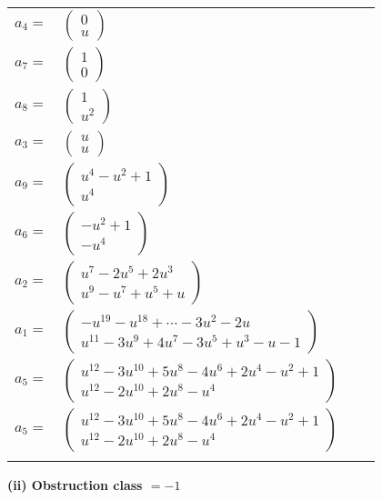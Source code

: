 \documentclass[1p]{elsarticle_modified}
\theoremstyle{definition}
\begin{document}
\begin{tabular}{m{7pt} m{180pt} m{7pt} m{180pt} }
\flushright $a_{4}=$&$\begin{pmatrix}0\\u\end{pmatrix}$ \\
\flushright $a_{7}=$&$\begin{pmatrix}1\\0\end{pmatrix}$ \\
\flushright $a_{8}=$&$\begin{pmatrix}1\\u^2\end{pmatrix}$ \\
\flushright $a_{3}=$&$\begin{pmatrix}u\\u\end{pmatrix}$ \\
\flushright $a_{9}=$&$\begin{pmatrix}u^4- u^2+1\\u^4\end{pmatrix}$ \\
\flushright $a_{6}=$&$\begin{pmatrix}- u^2+1\\- u^4\end{pmatrix}$ \\
\flushright $a_{2}=$&$\begin{pmatrix}u^7-2 u^5+2 u^3\\u^9- u^7+u^5+u\end{pmatrix}$ \\
\flushright $a_{1}=$&$\begin{pmatrix}- u^{19}- u^{18}+\cdots-3 u^2-2 u\\u^{11}-3 u^9+4 u^7-3 u^5+u^3- u-1\end{pmatrix}$ \\
\flushright $a_{5}=$&$\begin{pmatrix}u^{12}-3 u^{10}+5 u^8-4 u^6+2 u^4- u^2+1\\u^{12}-2 u^{10}+2 u^8- u^4\end{pmatrix}$\\ \flushright $a_{5}=$&$\begin{pmatrix}u^{12}-3 u^{10}+5 u^8-4 u^6+2 u^4- u^2+1\\u^{12}-2 u^{10}+2 u^8- u^4\end{pmatrix}$\\&\end{tabular}
\flushleft \textbf{(ii) Obstruction class $= -1$}\\~\\
\end{document}
